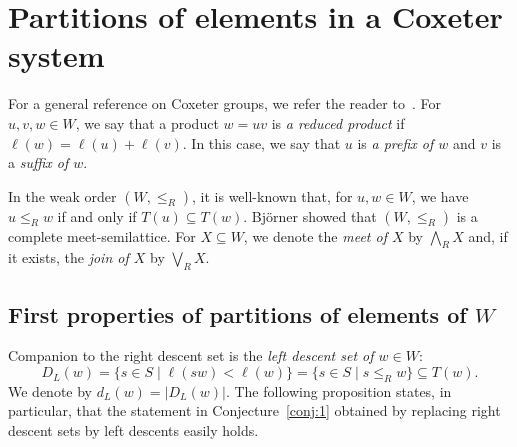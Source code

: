 \documentclass[Unicode]{cedram-alco}
\theoremstyle{definition}
\begin{document}
\section{Partitions of elements in a Coxeter system}\label{se:1}

For a general reference on Coxeter groups, we refer the reader to~\cite{BjBr05}. For $u,v,w\in W$, we say that a product $w=uv$ is {\em a reduced product} if $\ell(w)=\ell(u)+\ell(v)$. In this case, we say that $u$ is {\em a prefix of $w$} and $v$ is a {\em suffix of $w$}.  

In  the weak order $(W,\leq_R)$, it is well-known that, for $u,w\in W$, we have $u\leq_R w$ if and only if $T(u)\subseteq T(w)$. Bj\" orner showed that $(W,\leq_R)$ is a complete meet-semilattice.  For $X\subseteq W$, we denote the {\em meet of $X$} by $\bigwedge_R X$   and, if it exists, the {\em join of $X$} by $\bigvee_R X$.

\subsection{First properties of partitions of elements of \texorpdfstring{$W$}{W}} Companion to the right descent set is the {\em left descent set of $w\in W$}:
$$
D_L(w)=\{s\in S\mid \ell(sw)<\ell(w)\}=\{s\in S\mid s\leq_R w\}\subseteq T(w).
$$
We denote by $d_L(w)=|D_L(w)|$. The following proposition states, in particular, that the statement in  Conjecture~\ref{conj:1} obtained by replacing right descent sets  by left descents easily holds. 
 
\end{document}
